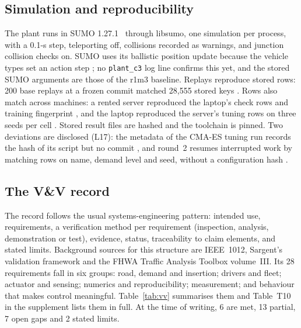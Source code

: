 \subsection{Simulation and reproducibility}\label{sec:reproducibility}

The plant runs in SUMO 1.27.1~\autocite{Lopez2018} through libsumo, one simulation per process, with a 0.1-s step, teleporting off, collisions recorded as warnings, and junction collision checks on.
SUMO uses its ballistic position update because the vehicle types set an action step ; no \texttt{plant\_c3} log line confirms this yet, and the stored SUMO arguments are those of the r1m3 baseline.
Replays reproduce stored rows: 200 base replays at a frozen commit matched 28,555 stored keys .
Rows also match across machines: a rented server reproduced the laptop's check rows and training fingerprint , and the laptop reproduced the server's tuning rows on three seeds per cell .
Stored result files are hashed and the toolchain is pinned.
Two deviations are disclosed (L17): the metadata of the CMA-ES tuning run records the hash of its script but no commit , and round~2 resumes interrupted work by matching rows on name, demand level and seed, without a configuration hash .

\subsection{The V\&V record}\label{sec:vv_record}

The record follows the usual systems-engineering pattern: intended use, requirements, a verification method per requirement (inspection, analysis, demonstration or test), evidence, status, traceability to claim elements, and stated limits.
Background sources for this structure are IEEE~1012, Sargent's validation framework and the FHWA Traffic Analysis Toolbox volume~III\verify.
Its 28 requirements fall in six groups: road, demand and insertion; drivers and fleet; actuator and sensing; numerics and reproducibility; measurement; and behaviour that makes control meaningful.
Table~\ref{tab:vv} summarises them and Table~T10 in the supplement lists them in full.
At the time of writing, 6 are met, 13 partial, 7 open gaps and 2 stated limits.

